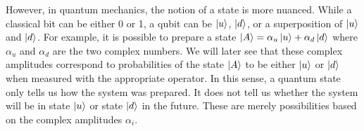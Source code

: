 \documentclass{article}
\begin{document}
  However, in quantum mechanics, the notion of a state is more nuanced. While
  a classical bit can be either 0 or 1, a qubit can be \(\ket{u}\), \(\ket{d}\),
  or a superposition of \(\ket{u}\) and \(\ket{d}\). For example, it is possible to prepare a
  state \(\ket{A}= \alpha_u\ket{u} + \alpha_d\ket{d}\) where \(\alpha_u\) and
   \(\alpha_d\) are the two complex numbers. We will later see that these complex
   amplitudes correspond to probabilities of the state \(\ket{A}\) to be either
   \(\ket{u}\) or \(\ket{d}\) when measured with the appropriate operator. In this
   sense, a quantum state only tells us how the system was prepared.
   It does not tell us whether the system will be in state \(\ket{u}\) or
   state \(\ket{d}\) in the future. These are merely possibilities based on the
   complex amplitudes \(\alpha_i\).
\end{document}
